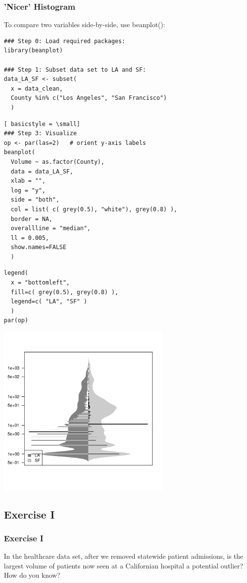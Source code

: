 \begin{frame}
	\frametitle{'Nicer' Histogram}

To compare two variables side-by-side, use \ttfamily beanplot(): \normalfont

	\begin{lstlisting}
### Step 0: Load required packages:
library(beanplot)

### Step 1: Subset data set to LA and SF:
data_LA_SF <- subset(
  x = data_clean, 
  County %in% c("Los Angeles", "San Francisco") 
  )
  \end{lstlisting}

\newpage
  \begin{lstlisting}[ basicstyle = \small]
### Step 3: Visualize  
op <- par(las=2)   # orient y-axis labels
beanplot(
  Volume ~ as.factor(County), 
  data = data_LA_SF, 
  xlab = "",
  log = "y",
  side = "both", 
  col = list( c( grey(0.5), "white"), grey(0.8) ), 
  border = NA, 
  overallline = "median", 
  ll = 0.005,
  show.names=FALSE
  )
  \end{lstlisting}

\newpage
  \begin{lstlisting}
legend(
  x = "bottomleft",
  fill=c( grey(0.5), grey(0.8) ), 
  legend=c( "LA", "SF" )
  )
par(op)
	\end{lstlisting}

\newpage
        \begin{center}
	         \includegraphics[width=0.65\textwidth]{images/beanplot.pdf}
        \end{center}

\end{frame}



\subsection{Exercise I}
\begin{frame}
	\frametitle{Exercise I}
	In the healthcare data set, after we removed statewide patient admissions, is the largest volume of patients now seen at a Californian hospital a potential outlier?  How do you know?
\end{frame}